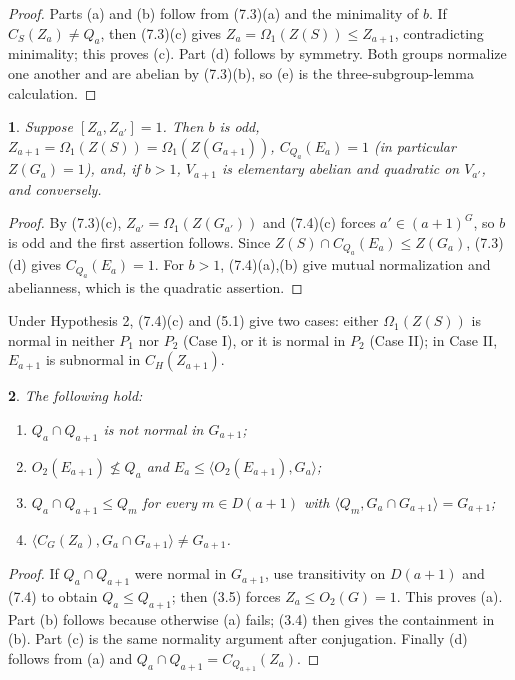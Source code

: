 \documentclass[11pt]{article}
\theoremstyle{plain}
\theoremstyle{stmplain}
\newtheorem{stm}{}[section]
\begin{document}
\begin{proof}
Parts (a) and (b) follow from (7.3)(a) and the minimality of $b$. If
$C_S(Z_a)\ne Q_a$, then (7.3)(c) gives $Z_a=\Omega_1(Z(S))\le Z_{a+1}$,
contradicting minimality; this proves (c). Part (d) follows by symmetry.
Both groups normalize one another and are abelian by (7.3)(b), so (e) is
the three-subgroup-lemma calculation.
\end{proof}

\begin{stm}\label{st:7.5}
Suppose $[Z_a,Z_{a'}]=1$. Then $b$ is odd,
$Z_{a+1}=\Omega_1(Z(S))=\Omega_1(Z(G_{a+1}))$,
$C_{Q_a}(E_a)=1$ (in particular $Z(G_a)=1$), and, if $b>1$,
$V_{a+1}$ is elementary abelian and quadratic on $V_{a'}$, and conversely.
\end{stm}

\begin{proof}
By (7.3)(c), $Z_{a'}=\Omega_1(Z(G_{a'}))$ and (7.4)(c) forces
$a'\in(a+1)^G$, so $b$ is odd and the first assertion follows. Since
$Z(S)\cap C_{Q_a}(E_a)\le Z(G_a)$, (7.3)(d) gives $C_{Q_a}(E_a)=1$.
For $b>1$, (7.4)(a),(b) give mutual normalization and abelianness, which
is the quadratic assertion.
\end{proof}

\noindent Under Hypothesis 2, (7.4)(c) and (5.1) give two cases: either
$\Omega_1(Z(S))$ is normal in neither $P_1$ nor $P_2$ (Case I), or it is
normal in $P_2$ (Case II); in Case II, $E_{a+1}$ is subnormal in
$C_H(Z_{a+1})$.

\begin{stm}\label{st:7.6}
The following hold:
\begin{enumerate}
\item[(a)] $Q_a\cap Q_{a+1}$ is not normal in $G_{a+1}$;
\item[(b)] $O_2(E_{a+1})\nleq Q_a$ and
  $E_a\le\langle O_2(E_{a+1}),G_a\rangle$;
\item[(c)] $Q_a\cap Q_{a+1}\le Q_m$ for every
  $m\in D(a+1)$ with $\langle Q_m,G_a\cap G_{a+1}\rangle=G_{a+1}$;
\item[(d)] $\langle C_G(Z_a),G_a\cap G_{a+1}\rangle\ne G_{a+1}$.
\end{enumerate}
\end{stm}

\begin{proof}
If $Q_a\cap Q_{a+1}$ were normal in $G_{a+1}$, use transitivity on
$D(a+1)$ and (7.4) to obtain $Q_a\le Q_{a+1}$; then (3.5) forces
$Z_a\le O_2(G)=1$. This proves (a). Part (b) follows because otherwise
(a) fails; (3.4) then gives the containment in (b). Part (c) is the same
normality argument after conjugation. Finally (d) follows from (a) and
$Q_a\cap Q_{a+1}=C_{Q_{a+1}}(Z_a)$.
\end{proof}
\end{document}
